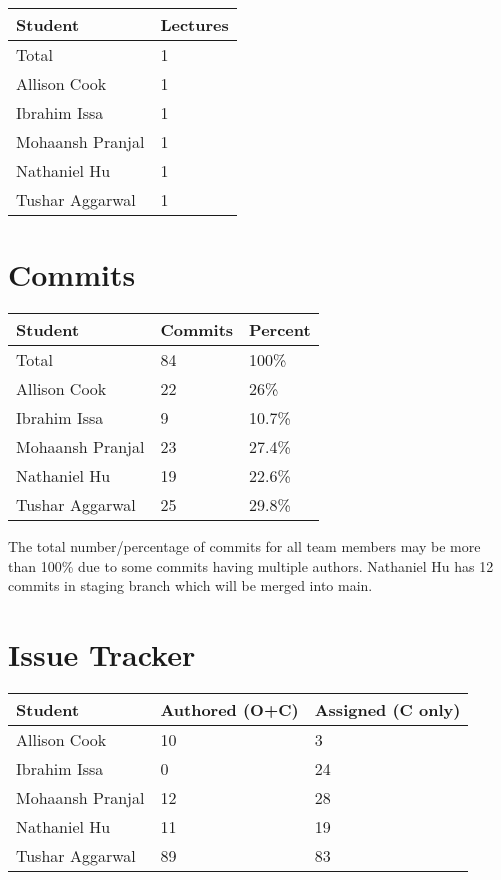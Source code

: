 \documentclass{article}
\begin{document}
\begin{table}[H]
\centering
\begin{tabular}{ll}
\toprule
\textbf{Student} & \textbf{Lectures}\\
\midrule
Total & 1\\
Allison Cook & 1 \\
Ibrahim Issa & 1 \\
Mohaansh Pranjal & 1 \\
Nathaniel Hu & 1 \\
Tushar Aggarwal & 1 \\
\bottomrule
\end{tabular}
\end{table}


\section{Commits}


\begin{table}[H]
\centering
\begin{tabular}{lll}
\toprule
\textbf{Student} & \textbf{Commits} & \textbf{Percent}\\
\midrule
Total & 84 & 100\% \\
Allison Cook & 22 & 26\% \\
Ibrahim Issa & 9 & 10.7\% \\
Mohaansh Pranjal & 23 & 27.4\% \\
Nathaniel Hu & 19 & 22.6\% \\
Tushar Aggarwal & 25 & 29.8\% \\
\bottomrule
\end{tabular}
\end{table}

The total number/percentage of commits for all team members may be more than 100\% due to some commits having multiple authors. Nathaniel Hu has 12 commits in staging branch which will be merged into main.

\section{Issue Tracker}


\begin{table}[H]
\centering
\begin{tabular}{lll}
\toprule
\textbf{Student} & \textbf{Authored (O+C)} & \textbf{Assigned (C only)}\\
\midrule
Allison Cook & 10 & 3 \\
Ibrahim Issa & 0 & 24 \\
Mohaansh Pranjal & 12 & 28 \\
Nathaniel Hu & 11 & 19 \\
Tushar Aggarwal & 89 & 83 \\
\bottomrule
\end{tabular}
\end{table}
\end{document}
